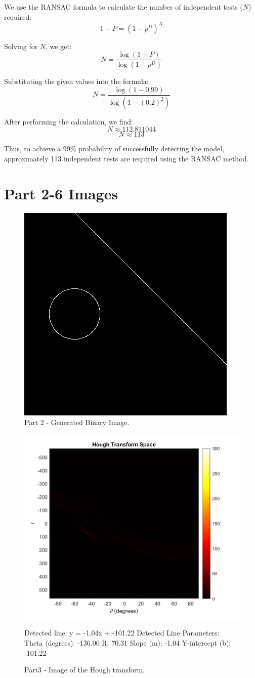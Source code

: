 \documentclass[12pt]{article}
\begin{document}
We use the RANSAC formula to calculate the number of independent tests (\(N\)) required:
\[1 - P = (1 - p^D)^N\]

Solving for \(N\), we get:
\[N = \frac{\log(1 - P)}{\log(1 - p^D)}\]

Substituting the given values into the formula:
\[N = \frac{\log(1 - 0.99)}{\log(1 - (0.2)^2)}\]

After performing the calculation, we find:
\[N \approx 112.811044\]
\[N \approx 113\]

Thus, to achieve a 99\% probability of successfully detecting the model, approximately 113 independent tests are required using the RANSAC method.

\clearpage
\part{Part 2-6 Images}


\begin{figure}
	\centering
	\includegraphics[width=0.7\linewidth]{binaryImage}
	\caption{Part 2 - Generated Binary Image.}
	\label{fig:binaryimage}
\end{figure}

\begin{figure}
	\centering
	\includegraphics[width=0.7\linewidth]{HoughSpace}
	\caption{Part3 - Image of the Hough transform.}
	\label{fig:houghspace}
	\text Detected line: y = -1.04x + -101.22
	Detected Line Parameters:
	Theta (degrees): -136.00
	R: 70.31
	Slope (m): -1.04
	Y-intercept (b): -101.22
\end{figure}
\end{document}
